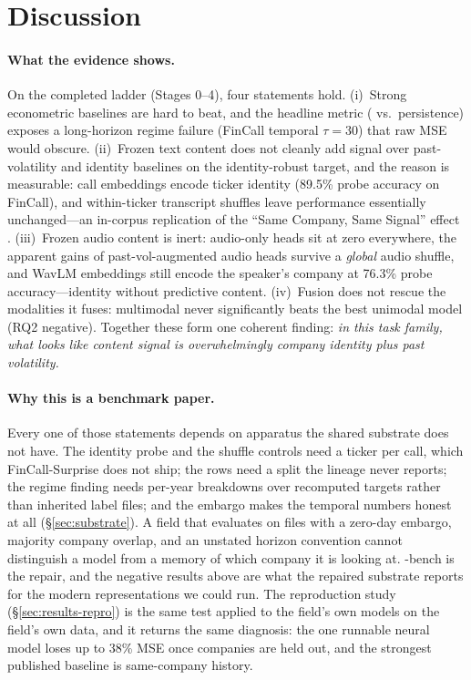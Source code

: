 \section{Discussion}
\label{sec:discussion}

\paragraph{What the evidence shows.}
On the completed ladder (Stages 0--4), four statements hold. (i)~Strong econometric
baselines are hard to beat, and the headline metric (\Rtwo{} vs.\ persistence)
exposes a long-horizon regime failure (FinCall temporal $\tau{=}30$) that raw MSE
would obscure. (ii)~Frozen text content does not cleanly add signal over
past-volatility and identity baselines on the identity-robust \dv{} target, and the
reason is measurable: call embeddings encode ticker identity (89.5\% probe accuracy
on FinCall), and within-ticker transcript shuffles leave performance essentially
unchanged---an in-corpus replication of the ``Same Company, Same Signal'' effect
\citep{scss2024}. (iii)~Frozen audio content is inert: audio-only heads sit at
\Rtwo{} zero everywhere, the apparent gains of past-vol-augmented audio heads
survive a \emph{global} audio shuffle, and WavLM embeddings still encode the
speaker's company at 76.3\% probe accuracy---identity without predictive content.
(iv)~Fusion does not rescue the modalities it fuses: multimodal never significantly
beats the best unimodal model (RQ2 negative). Together these form one coherent
finding: \emph{in this task family, what looks like content signal is
overwhelmingly company identity plus past volatility.}

\paragraph{Why this is a benchmark paper.}
Every one of those statements depends on apparatus the shared substrate does not
have. The identity probe and the shuffle controls need a ticker per call, which
FinCall-Surprise does not ship; the \tickerdisjoint{} rows need a split the lineage
never reports; the regime finding needs per-year breakdowns over recomputed
targets rather than inherited label files; and the embargo makes the temporal
numbers honest at all (\S\ref{sec:substrate}). A field that evaluates on files with
a zero-day embargo, majority company overlap, and an unstated horizon convention
cannot distinguish a model from a memory of which company it is looking at.
\ecvol-bench is the repair, and the negative results above are what the repaired
substrate reports for the modern representations we could run. The reproduction
study (\S\ref{sec:results-repro}) is the same test applied to the field's own
models on the field's own data, and it returns the same diagnosis: the one runnable
neural model loses up to 38\% MSE once companies are held out, and the strongest
published baseline is same-company history.

